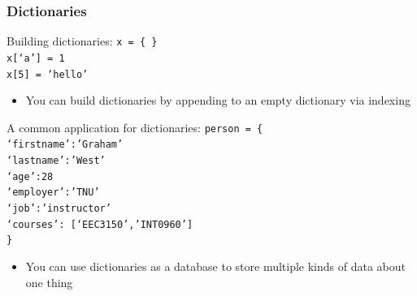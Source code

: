 \documentclass{beamer}
\newcommand{\code}[1]{\texttt{#1}}
\begin{document}
\begin{frame}	
	\frametitle{Dictionaries}
	
	\begin{block}{Building dictionaries:}
			\code{x = \{ \} \\
			x[`a'] = 1 \\
			x[5] = `hello'
			}
		\endminipage\hfill
			\begin{itemize}
				\item You can build dictionaries by appending to an empty dictionary via indexing
			\end{itemize}
		\endminipage\hfill
	\end{block}
	
	\begin{block}{A common application for dictionaries:}
			\code{person = \{ \\
			`firstname':'Graham' \\
			`lastname':'West' \\
			`age':28 \\
			`employer':'TNU' \\
			`job':'instructor' \\
			`courses': [`EEC3150','INT0960'] \\
			\}
			}
		\endminipage\hfill
			\begin{itemize}
				\item You can use dictionaries as a database to store multiple kinds of data about one thing
			\end{itemize}
		\endminipage\hfill
	\end{block}

\end{frame}
\end{document}
